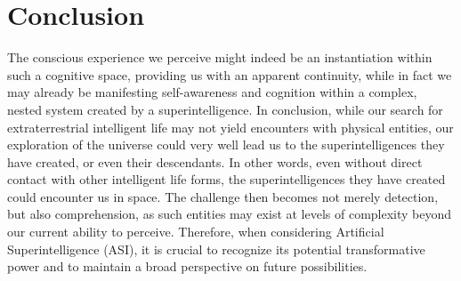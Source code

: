 \documentclass[12pt]{article}
\begin{document}
\section{Conclusion}
The conscious experience we perceive might indeed be an instantiation within such a cognitive space, providing us with an apparent continuity, while in fact we may already be manifesting self-awareness and cognition within a complex, nested system created by a superintelligence. In conclusion, while our search for extraterrestrial intelligent life may not yield encounters with physical entities, our exploration of the universe could very well lead us to the superintelligences they have created, or even their descendants. In other words, even without direct contact with other intelligent life forms, the superintelligences they have created could encounter us in space. The challenge then becomes not merely detection, but also comprehension, as such entities may exist at levels of complexity beyond our current ability to perceive. Therefore, when considering Artificial Superintelligence (ASI), it is crucial to recognize its potential transformative power and to maintain a broad perspective on future possibilities.
\end{document}
